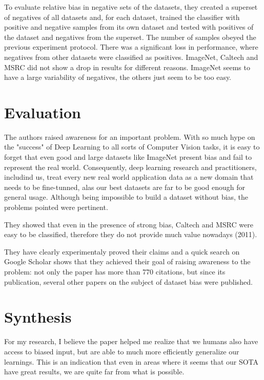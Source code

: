 \documentclass[
10pt, %
a4paper, %
onecolumn, %
]{article}
\begin{document}
\begin{description}
To evaluate relative bias in negative sets of the datasets, they created a superset of negatives of all datasets and, for each dataset, trained the classifier with positive and negative samples from its own dataset and tested with positives of the dataset and negatives from the superset. The number of samples obeyed the previous experiment protocol. There was a significant loss in performance, where negatives from other datasets were classified as positives. ImageNet, Caltech and MSRC did not show a drop in results for different reasons.  ImageNet seems to have a large variability of negatives, the others just seem to be too easy.
\end{description}


\section*{Evaluation}

The authors raised awareness for an important problem. With so much hype on the "success" of Deep Learning to all sorts of Computer Vision tasks, it is easy to forget that even good and large datasets like ImageNet present bias and fail to represent the real world.  Consequently, deep learning research and practitioners, includind us, treat every new real world application data as a new domain that needs to be fine-tunned, alas our best datasets are far to be good enough for general usage. Although being impossible to build a dataset without bias, the problems pointed were pertinent. 

They showed that even in the presence of strong bias, Caltech and MSRC were easy to be classified, therefore they do not provide much value nowadays (2011).

They have clearly experimentaly proved their claims and a quick search on Google Scholar shows that they achieved their goal of raising awareness to the problem: not only the paper has more than 770 citations, but since its publication, several other papers on the subject of dataset bias were published. 



\section*{Synthesis}


For my research, I believe the paper helped me realize that we humans also have access to biased input, but are able to much more efficiently generalize our learnings. This is an indication that even in areas where it seems that our SOTA have great results, we are quite far from what is possible. 
\end{document}
